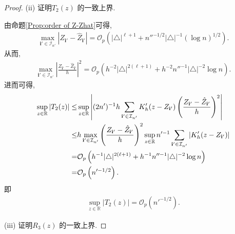 \documentclass[a4paper,openay,14pt]{ctexbook}
\numberwithin{equation}{section}
\numberwithin{lem}{section}
\begin{document}
\begin{proof}
\medskip
\noindent
(ii) 证明$T_2(z)$ 的一致上界.

由命题\ref{Prop:order of Z-Zhat}可得,
        \begin{align*}
            \max_{\mathbf{i}'\in\mathcal{I}_{n'}}\left\vert Z_{\mathbf{i}'} - \hat{Z}_{\mathbf{i}'}\right\vert = \mathcal{O}_p\left(\vert\triangle\vert^{\ell+1}+n''^{-1/2}\vert\triangle\vert^{-1}(\log n)^{1/2}\right).
        \end{align*}
从而,
 \begin{align*}
            \max_{\mathbf{i}'\in\mathcal{I}_{n'}}\left\vert\frac{Z_{\mathbf{i}'}-\hat{Z}_{\mathbf{i}'}}{h}\right\vert^2 = \mathcal{O}_p\left(h^{-2}\vert\triangle\vert^{2(\ell+1)}+h^{-2}n''^{-1}\vert\triangle\vert^{-2}\log n\right).
        \end{align*}
进而可得,
         \begin{align}
            \sup_{z\in\mathbb{R}}\left\vert T_2(z)\right\vert 
            \leq &\sup_{z\in\mathbb{R}}\left\vert (2n')^{-1}h\sum_{\mathbf{i}'\in\mathcal{I}_{n'}}K_h'(z-Z_{\mathbf{i}'})\left(\frac{Z_{\mathbf{i}'}-\hat{Z}_{\mathbf{i}'}}{h}\right)^2\right\vert\notag\\
            \leq& h\max_{\mathbf{i}'\in\mathcal{I}_{n'}}\left(\frac{Z_{\mathbf{i}'}-\hat{Z}_{\mathbf{i}'}}{h}\right)^2\sup_{z\in\mathbb{R}}n'^{-1}\sum_{\mathbf{i}'\in\mathcal{I}_{n'}}\left\vert K_h'(z-Z_{\mathbf{i}'})\right\vert\notag\\
            =&\mathcal{O}_p\left(h^{-1}\vert\triangle\vert^{2(\ell+1)}+h^{-1}n''^{-1}\vert\triangle\vert^{-2}\log n\right)\notag\\
            =&\mathcal{O}_p\left(n'^{-1/2}\right)\notag.
        \end{align}
即
\begin{align}\label{OUTCOME:T2}
    \sup_{z\in\mathbb{R}}|T_2(z)|
    ={\scriptstyle\mathcal{O}}_p\left(n'^{-1/2}\right).
\end{align}

\medskip
\noindent
(iii) 证明$R_3(z)$ 的一致上界.


\end{proof}
\end{document}

